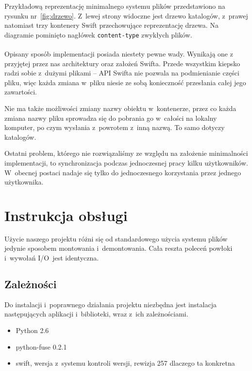 Przykładową reprezentację minimalnego systemu plików przedstawiono na rysunku
nr~\ref{fig:drzewo}. Z~lewej strony widoczne jest drzewo katalogów, z~prawej
natomiast trzy kontenery Swift przechowujące reprezentację drzewa. Na diagramie
pominięto nagłówek \texttt{content-type} zwykłych plików.

\paragraph{}
Opisany sposób implementacji posiada niestety pewne wady. Wynikają one z
przyjętej przez nas architektury oraz założeń Swifta. Przede wszystkim \cb{}
kiepsko radzi sobie z~dużymi plikami -- API Swifta nie pozwala na podmienianie
części pliku, więc każda zmiana w~pliku niesie ze sobą konieczność przesłania
całej jego zawartości.

Nie ma także możliwości zmiany nazwy obiektu w~kontenerze, przez co każda zmiana
nazwy pliku sprowadza się do pobrania go w~całości na lokalny komputer, po czym
wysłania z~powrotem z~inną nazwą. To samo dotyczy katalogów.

Ostatni problem, którego nie rozwiązaliśmy ze względu na założenie minimalności
implementacji, to synchronizacja podczas jednoczesnej pracy kilku użytkowników.
W~obecnej postaci \cb{} nadaje się tylko do jednoczesnego korzystania przez
jednego użytkownika.

\section{Instrukcja obsługi}
Użycie naszego projektu różni się od standardowego użycia systemu plików
jedynie sposobem montowania i~demontowania. Cała reszta poleceń powłoki
i~wywołań I/O~jest identyczna.

\subsection{Zależności}

Do instalacji i~poprawnego działania projektu \cb{} niezbędna jest instalacja
następujących aplikacji i~biblioteki, wraz z~ich zależnościami.

\begin{itemize}
	\item{Python 2.6}
	\item{python-fuse 0.2.1}
	\item{swift, wersja z~systemu kontroli wersji, rewizja 257 \todo dlaczego
		ta konkretna}
\end{itemize}

